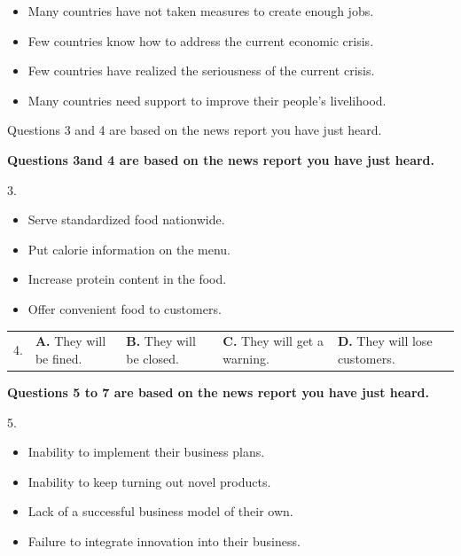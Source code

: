\documentclass[UTF8,11pt]{ctexart}
\begin{document}
\begin{itemize}[leftmargin=2em,itemsep=.2em,topsep=.4em]\item[A.] Many countries have not taken measures to create enough jobs.
\item[B.] Few countries know how to address the current economic crisis.
\item[C.] Few countries have realized the seriousness of the current crisis.
\item[D.] Many countries need support to improve their people's livelihood.
\end{itemize}

Questions 3 and 4 are based on the news report you have just heard.


\textbf{Questions 3and 4 are based on the news report you have just heard.}


3.


\begin{itemize}[leftmargin=2em,itemsep=.2em,topsep=.4em]\item[A.] Serve standardized food nationwide.
\item[B.] Put calorie information on the menu.
\item[C.] Increase protein content in the food.
\item[D.] Offer convenient food to customers.
\end{itemize}

\noindent\begin{tabularx}{\linewidth}{@{}lXXXX@{}}4. & \textbf{A.} They will be fined. & \textbf{B.} They will be closed. & \textbf{C.} They will get a warning. & \textbf{D.} They will lose customers.\\\end{tabularx}\par

\textbf{Questions 5 to 7 are based on the news report you have just heard.}


5.


\begin{itemize}[leftmargin=2em,itemsep=.2em,topsep=.4em]\item[A.] Inability to implement their business plans.
\item[B.] Inability to keep turning out novel products.
\item[C.] Lack of a successful business model of their own.
\item[D.] Failure to integrate innovation into their business.
\end{itemize}
\end{document}
